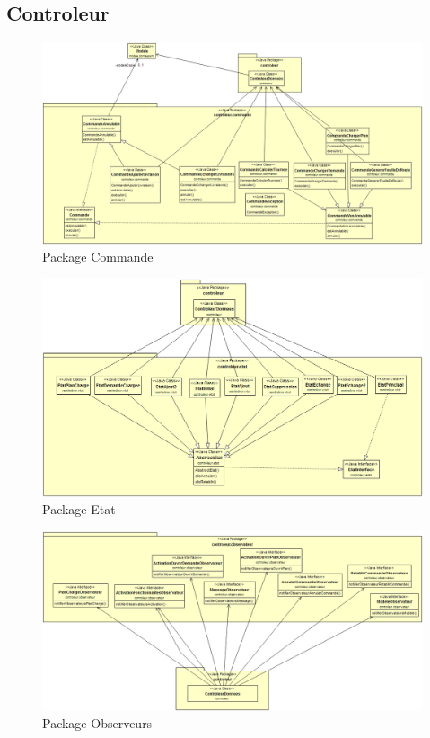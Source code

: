 \documentclass[10pt,a4paper]{book}
\begin{document}
\subsection{Controleur}
\begin{figure}[h!]
    \centering
    \includegraphics[scale=0.38]{DcCommande.png}
    \caption{Package Commande}
\end{figure}
\newpage
\begin{figure}[h!]
    \centering
    \includegraphics[scale=0.35]{DcEtat.png}
    \caption{Package Etat}
\end{figure}
\begin{figure}[h!]
    \centering
    \includegraphics[scale=0.35]{DcObservateur.png}
    \caption{Package Observeurs}
\end{figure}
\end{document}
